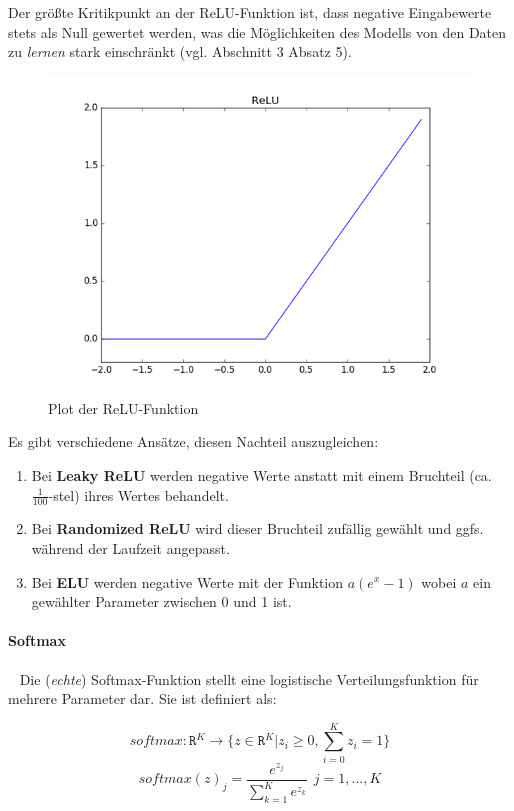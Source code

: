 Der größte Kritikpunkt an der ReLU-Funktion ist, dass negative Eingabewerte stets als Null gewertet werden, was die Möglichkeiten des Modells von den Daten zu \textit{lernen} stark einschränkt (vgl. \cite{sigmoid} Abschnitt 3 Absatz 5). 
\begin{figure}[h]
	\begin{center}
		\includegraphics[width=0.5\linewidth]{Bilder/ReluPlot}
		\caption[Rectified Linear Unit: \url{
			https://leonardoaraujosantos.gitbooks.io/artificial-inteligence/content/relu_layer.html}]{Plot der ReLU-Funktion}
		\label{fig:ReLUplot}
	\end{center}
\end{figure}  
Es gibt verschiedene Ansätze, diesen Nachteil auszugleichen: ~\newline
\begin{enumerate}
	 \item Bei \textbf{Leaky ReLU} werden negative Werte anstatt mit einem Bruchteil (ca. $\frac{1}{100}$-stel) ihres Wertes behandelt. 
	\item Bei \textbf{Randomized ReLU} wird dieser Bruchteil zufällig gewählt und ggfs. während der Laufzeit angepasst. 
	\item Bei \textbf{ELU} werden negative Werte mit der Funktion $a(e^x-1)$ wobei $a$ ein gewählter Parameter zwischen 0 und 1 ist.
\end{enumerate}
 
\paragraph{Softmax}~\newline
Die (\textit{echte}) Softmax-Funktion stellt eine logistische Verteilungsfunktion für mehrere Parameter dar. Sie ist definiert als: 

\begin{equation}
	\label{eq:Softmax}
	softmax: \mathtt{R}^K \rightarrow \lbrace z \in \mathtt{R}^K | z_i \geq 0 , \sum_{i=0}^{K} z_i = 1 \rbrace
\end{equation}
\begin{equation}
\label{eq:Softmax2}
	softmax(z)_j = \dfrac{e^{z_j}}{\sum_{k=1}^{K}e^{z_k}}  \ \  j = 1, ... , K
\end{equation}

